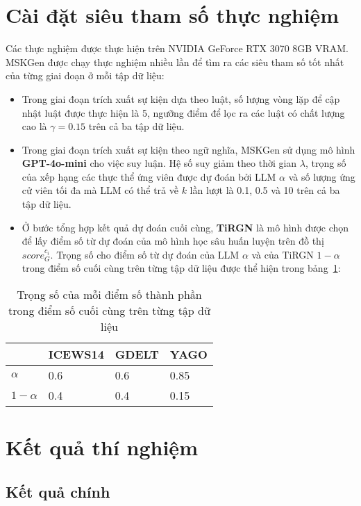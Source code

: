\section{Cài đặt siêu tham số thực nghiệm}
Các thực nghiệm được thực hiện trên NVIDIA GeForce RTX 3070 8GB VRAM. MSKGen được chạy thực nghiệm nhiều lần để tìm ra các siêu tham số
tốt nhất của từng giai đoạn ở mỗi tập dữ liệu:
\begin{itemize}
    \item Trong giai đoạn trích xuất sự kiện dựa theo luật, số lượng vòng lặp để cập nhật luật được thực hiện là 5, 
ngưỡng điểm để lọc ra các luật có chất lượng cao là $\gamma = 0.15$ trên cả ba tập dữ liệu.
    \item Trong giai đoạn trích xuất sự kiện theo ngữ nghĩa, MSKGen sử dụng mô hình \textbf{GPT-4o-mini} cho việc suy luận. 
    Hệ số suy giảm theo thời gian $\lambda$, trọng số của xếp hạng các thực thể ứng viên được dự đoán bởi LLM $\alpha$ và
    số lượng ứng cử viên tối đa mà LLM có thể trả về $k$ lần lượt là 0.1, 0.5 và 10 trên cả ba tập dữ liệu. 
    \item Ở bước tổng hợp kết quả dự đoán cuối cùng, \textbf{TiRGN} là mô hình được chọn để lấy điểm số từ dự đoán của mô hình học sâu 
    huấn luyện trên đồ thị $score_{G}^{c_i}$. Trọng số cho điểm số từ dự đoán của LLM $\alpha$ và của TiRGN $1 - \alpha$
    trong điểm số cuối cùng trên từng tập dữ liệu được thể hiện trong bảng~\ref{tab:table53}:
\end{itemize}

\begin{table}[H]
\caption{Trọng số của mỗi điểm số thành phần trong điểm số cuối cùng trên từng tập dữ liệu}
\label{tab:table53}
\begin{adjustbox}{width=\textwidth}
\begin{tabular}{|l|l|l|l|}
\hline
           & ICEWS14 & GDELT & YAGO \\ \hline
$\alpha$   & 0.6     & 0.6   & 0.85 \\ \hline
$1-\alpha$ & 0.4     & 0.4   & 0.15 \\ \hline
\end{tabular}
\end{adjustbox}  
\end{table}
  

\section{Kết quả thí nghiệm}
\subsection{Kết quả chính}

